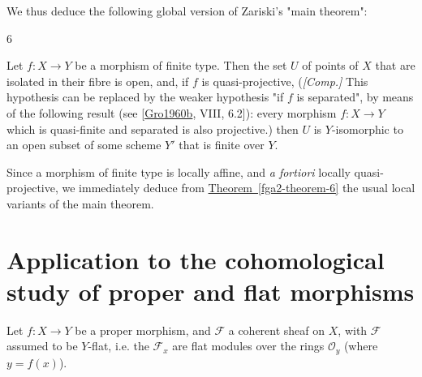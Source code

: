   We thus deduce the following global version of Zariski's "main theorem":\begin{theorem}{6}\label{fga2-theorem-6}\skipsinglepar\par{}Let \(f\colon  X\to  Y\) be a morphism of finite type.
    Then the set \(U\) of points of \(X\) that are isolated in their fibre is open, and, if \(f\) is quasi-projective,
    (\emph{[Comp.]} This hypothesis can be replaced by the weaker hypothesis "if \(f\) is separated", by means of the following result (see [\hyperref[Gro1960b]{Gro1960b}, VIII, 6.2]): every morphism \(f\colon  X\to  Y\) which is quasi-finite and separated is also projective.)
    then \(U\) is \(Y\)-isomorphic to an open subset of some scheme \(Y'\) that is finite over \(Y\).\end{theorem}\par{}Since a morphism of finite type is locally affine, and \emph{a fortiori} locally quasi-projective, we immediately deduce from \hyperref[fga2-theorem-6]{Theorem~\ref*{fga2-theorem-6}} the usual local variants of the main theorem.\chapter{Application to the cohomological study of proper and flat morphisms}\thispagestyle{fancy}\label{fga2-5}\par{}Let \(f\colon  X\to  Y\) be a proper morphism, and \(\mathscr {F}\) a coherent sheaf on \(X\), with \(\mathscr {F}\) assumed to be \(Y\)-flat, i.e. the \(\mathscr {F}_x\) are flat modules over the rings \(\mathcal {O}_y\) (where \(y=f(x)\)).
  
